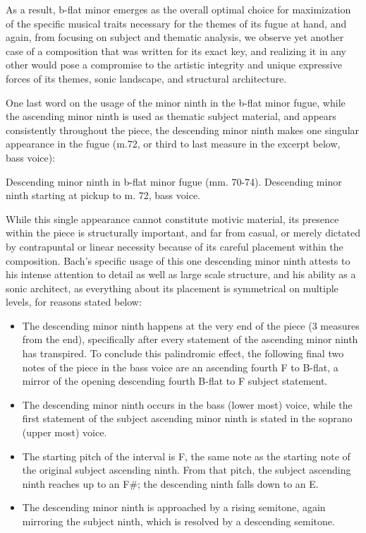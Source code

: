As a result, b-flat minor emerges as the overall optimal choice for
maximization of the specific musical traits necessary for the themes of
its fugue at hand, and again, from focusing on subject and thematic
analysis, we observe yet another case of a composition that was written
for its exact key, and realizing it in any other would pose a compromise
to the artistic integrity and unique expressive forces of its themes,
sonic landscape, and structural architecture.

One last word on the usage of the minor ninth in the b-flat minor fugue,
while the ascending minor ninth is used as thematic subject material,
and appears consistently throughout the piece, the descending minor
ninth makes one singular appearance in the fugue (m.72, or third to last
measure in the excerpt below, bass voice):



\begin{Example}[H]
\vspace{1.5em}
    \centering
    \caption[Descending minor ninth in b-flat minor fugue (mm. 70-74). ]{ Descending minor ninth in b-flat minor fugue (mm. 70-74). Descending minor ninth starting at pickup to m. 72, bass voice.}
\end{Example}    
    While this single appearance cannot constitute motivic material, its
presence within the piece is structurally important, and far from
casual, or merely dictated by contrapuntal or linear necessity because
of its careful placement within the composition. Bach's specific usage
of this one descending minor ninth attests to his intense attention to
detail as well as large scale structure, and his ability as a sonic
architect, as everything about its placement is symmetrical on multiple
levels, for reasons stated below:

\begin{itemize}
\tightlist
\item
  The descending minor ninth happens at the very end of the piece (3
  measures from the end), specifically after every statement of the
  ascending minor ninth has transpired. To conclude this palindromic
  effect, the following final two notes of the piece in the bass voice
  are an ascending fourth F to B-flat, a mirror of the opening
  descending fourth B-flat to F subject statement.
\item
  The descending minor ninth occurs in the bass (lower most) voice,
  while the first statement of the subject ascending minor ninth is
  stated in the soprano (upper most) voice.
\item
  The starting pitch of the interval is F, the same note as the starting
  note of the original subject ascending ninth. From that pitch, the
  subject ascending ninth reaches up to an F\#; the descending ninth
  falls down to an E.
\item
  The descending minor ninth is approached by a rising semitone, again
  mirroring the subject ninth, which is resolved by a descending
  semitone.
\end{itemize}

